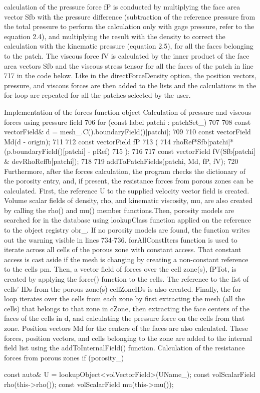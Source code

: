 {calculation of the pressure force fP is conducted by multiplying the face area vector Sfb with the
pressure difference (subtraction of the reference pressure from the total pressure to perform the
calculation only with gage pressure, refer to the equation 2.4), and multiplying the result with
the density to correct the calculation with the kinematic pressure (equation 2.5), for all the faces
belonging to the patch. The viscous force fV is calculated by the inner product of the face area
vectors Sfb and the viscous stress tensor for all the faces of the patch in line 717 in the code below.
Like in the directForceDensity option, the position vectors, pressure, and viscous forces are then
added to the lists and the calculations in the for loop are repeated for all the patches selected by
the user.

Implementation of the forces function object
Calculation of pressure and viscous forces using pressure field
706 for (const label patchi : patchSet\_)
707 {
708 const vectorField\& d = mesh\_.C().boundaryField()[patchi];
709
710 const vectorField Md(d - origin);
711
712 const vectorField fP
713 (
714 rhoRef*Sfb[patchi]*(p.boundaryField()[patchi] - pRef)
715 );
716
717 const vectorField fV(Sfb[patchi] \& devRhoReffb[patchi]);
718
719 addToPatchFields(patchi, Md, fP, fV);
720 }
Furthermore, after the forces calculation, the program checks the dictionary of the porosity entry, and, if present, the resistance forces from porous zones can be calculated. First, the reference U to the supplied velocity vector field is created. Volume scalar fields of density, rho, and kinematic viscosity, mu, are also created by calling the rho() and mu() member functions.Then, porosity models are searched for in the database using lookupClass function applied on the reference to the object registry obr\_. If no porosity models are found, the function writes out the warning visible in  lines 734-736. forAllConstIters function is used to iterate across all cells of the porous zone with constant access. That constant access is cast aside if the mesh is changing by creating a non-constant reference to the cells pm. Then, a vector field of forces over the cell zone(s), fPTot, is created by applying the force() function to the cells. The reference to the list of cells’ IDs from the porous
zone(s) cellZoneIDs is also created. Finally, the for loop iterates over the cells from each zone by first extracting the mesh (all the cells) that belongs to that zone in cZone, then extracting the face centers of the faces of the cells in d, and calculating the pressure force on the cells from that zone. Position vectors Md for the centers of the faces are also calculated. These forces, position vectors,
and cells belonging to the zone are added to the internal field list using the addToInternalField() 
function.
Calculation of the resistance forces from porous zones
if (porosity\_)
{
const auto\& U = lookupObject<volVectorField>(UName\_);
const volScalarField rho(this->rho());
const volScalarField mu(this->mu());

}}
